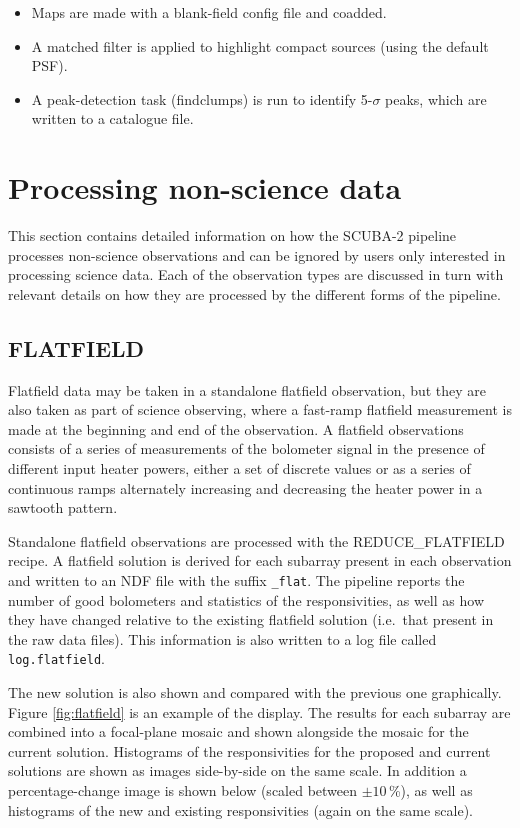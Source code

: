 \documentclass[twoside,11pt,nolof]{starlink}
\providecommand{\task}[1]{\textsf{#1}}
\begin{document}
\begin{itemize}
\item Maps are made with a blank-field config file and coadded.
\item A matched filter is applied to highlight compact sources (using
  the default PSF).
\item A peak-detection task (\task{findclumps}) is run to identify
  5-$\sigma$ peaks, which are written to a catalogue file.
\end{itemize}

\section{Processing non-science data\label{se:nonsci}}

This section contains detailed information on how the SCUBA-2 pipeline
processes non-science observations and can be ignored by users only
interested in processing science data. Each of the observation types
are discussed in turn with relevant details on how they are processed
by the different forms of the pipeline.

\subsection{FLATFIELD}

Flatfield data may be taken in a standalone flatfield observation, but
they are also taken as part of science observing, where a fast-ramp
flatfield measurement is made at the beginning and end of the
observation. A flatfield observations consists of a series of
measurements of the bolometer signal in the presence of different
input heater powers, either a set of discrete values or as a series of
continuous ramps alternately increasing and decreasing the heater
power in a sawtooth pattern.

Standalone flatfield observations are processed with the
\task{REDUCE\_FLATFIELD} recipe. A flatfield solution is derived for
each subarray present in each observation and written to an NDF file
with the suffix \verb+_flat+. The pipeline reports the number of good
bolometers and statistics of the responsivities, as well as how they
have changed relative to the existing flatfield solution (i.e.\ that
present in the raw data files). This information is also written to a
log file called \verb+log.flatfield+.

The new solution is also shown and compared with the previous one
graphically. Figure \ref{fig:flatfield} is an example of the
display. The results for each subarray are combined into a focal-plane
mosaic and shown alongside the mosaic for the current
solution. Histograms of the responsivities for the proposed and
current solutions are shown as images side-by-side on the same
scale. In addition a percentage-change image is shown below (scaled
between $\pm10$\,\%), as well as histograms of the new and existing
responsivities (again on the same scale).
\end{document}
